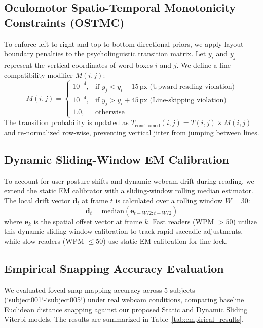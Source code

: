 \documentclass[sigconf]{acmart}
\begin{document}
\subsection{Oculomotor Spatio-Temporal Monotonicity Constraints (OSTMC)}
To enforce left-to-right and top-to-bottom directional priors, we apply layout boundary penalties to the psycholinguistic transition matrix. Let $y_i$ and $y_j$ represent the vertical coordinates of word boxes $i$ and $j$. We define a line compatibility modifier $M(i, j)$:
\begin{equation}
M(i, j) = 
\begin{cases}
10^{-4}, & \text{if } y_j < y_i - 15\,\text{px} \text{ (Upward reading violation)} \\
10^{-4}, & \text{if } y_j > y_i + 45\,\text{px} \text{ (Line-skipping violation)} \\
1.0, & \text{otherwise}
\end{cases}
\end{equation}
The transition probability is updated as $T_{\text{constrained}}(i, j) = T(i, j) \times M(i, j)$ and re-normalized row-wise, preventing vertical jitter from jumping between lines.

\subsection{Dynamic Sliding-Window EM Calibration}
To account for user posture shifts and dynamic webcam drift during reading, we extend the static EM calibrator with a sliding-window rolling median estimator. The local drift vector $\mathbf{d}_t$ at frame $t$ is calculated over a rolling window $W = 30$:
\begin{equation}
\mathbf{d}_t = \text{median}(\mathbf{e}_{t-W/2:t+W/2})
\end{equation}
where $\mathbf{e}_k$ is the spatial offset vector at frame $k$. Fast readers (WPM $> 50$) utilize this dynamic sliding-window calibration to track rapid saccadic adjustments, while slow readers (WPM $\le 50$) use static EM calibration for line lock.

\subsection{Empirical Snapping Accuracy Evaluation}
We evaluated foveal snap mapping accuracy across 5 subjects (`subject001`-`subject005`) under real webcam conditions, comparing baseline Euclidean distance snapping against our proposed Static and Dynamic Sliding Viterbi models. The results are summarized in Table~\ref{tab:empirical_results}.
\end{document}
